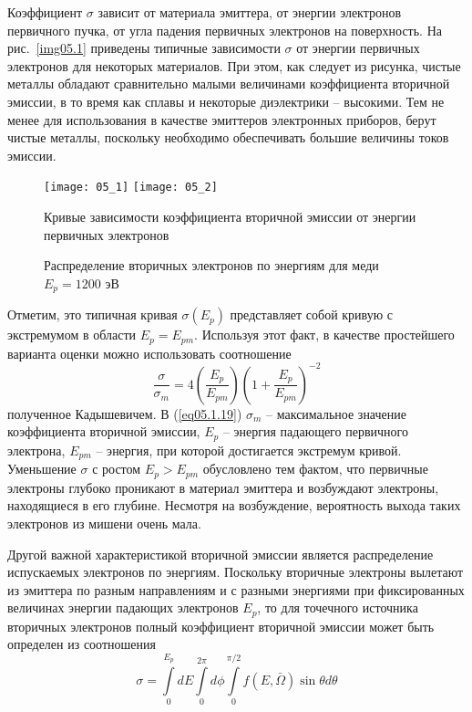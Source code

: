 Коэффициент \( \sigma \) зависит от материала эмиттера, от энергии электронов 
первичного пучка, от угла падения первичных электронов на поверхность. На 
рис.~\ref{img05.1} приведены типичные зависимости \( \sigma \) от энергии 
первичных электронов для некоторых материалов. При этом, как следует из 
рисунка, чистые металлы обладают сравнительно малыми величинами коэффициента 
вторичной эмиссии, в то время как сплавы и некоторые диэлектрики -- высокими. 
Тем не менее для использования в качестве эмиттеров электронных приборов, 
берут чистые металлы, поскольку необходимо обеспечивать большие величины токов 
эмиссии.
\begin{figure}[h]
    \center
    \texttt{[image: 05\_1]} \hspace{1em}
    \texttt{[image: 05\_2]} \\
    \parbox{.47\textwidth}{\caption{Кривые зависимости коэффициента вторичной
        эмиссии от энергии первичных электронов} \label{img05.1}} \hspace{1em}
    \parbox{.4\textwidth}{\caption{Распределение вторичных электронов по
        энергиям для меди \( E_p = 1200 \) эВ} \label{img05.2}}
\end{figure}

Отметим, это типичная кривая \( \sigma(E_p) \) представляет собой кривую с 
экстремумом в области \( E_p = E_{pm} \). Используя этот факт, в качестве 
простейшего варианта оценки можно использовать соотношение
\begin{equation}
    \frac{\sigma}{\sigma_m} = 4\left( \frac{E_p}{E_{pm}} \right)
        \left( 1 + \frac{E_p}{E_{pm}} \right)^{-2}
    \label{eq05.1.19}
\end{equation}
полученное Кадышевичем. В (\ref{eq05.1.19}) \( \sigma_{m} \) -- максимальное 
значение коэффициента вторичной эмиссии, \( E_p \) -- энергия падающего 
первичного электрона, \( E_{pm} \) -- энергия, при которой достигается 
экстремум кривой. Уменьшение \( \sigma \) с ростом \( E_p > E_{pm} \) 
обусловлено тем фактом, что первичные электроны глубоко проникают в материал 
эмиттера и возбуждают электроны, находящиеся в его глубине. Несмотря на 
возбуждение, вероятность выхода таких электронов из мишени очень мала.

Другой важной характеристикой вторичной эмиссии является распределение 
испускаемых электронов по энергиям. Поскольку вторичные электроны вылетают 
из эмиттера по разным направлениям и с разными энергиями при фиксированных 
величинах энергии падающих электронов \( E_p \), то для точечного источника 
вторичных электронов полный коэффициент вторичной эмиссии может быть определен 
из соотношения
\begin{equation}
    \sigma = \int\limits_{0}^{E_p} dE \int\limits_{0}^{2\pi} d\phi 
        \int\limits_{0}^{\pi/2} f(E,\bar{\Omega})\sin\theta d\theta
    \label{eq05.1.20}
\end{equation}

